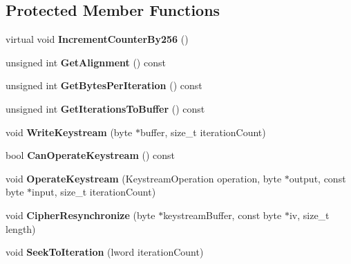 \subsection*{Protected Member Functions}
\begin{DoxyCompactItemize}
\item 
\hypertarget{class_c_t_r___mode_policy_a2827e15ef893609012cc1c0d672840b2}{
virtual void {\bfseries IncrementCounterBy256} ()}
\label{class_c_t_r___mode_policy_a2827e15ef893609012cc1c0d672840b2}

\item 
\hypertarget{class_c_t_r___mode_policy_a3e6d8211d0320374054c8fa580923d01}{
unsigned int {\bfseries GetAlignment} () const }
\label{class_c_t_r___mode_policy_a3e6d8211d0320374054c8fa580923d01}

\item 
\hypertarget{class_c_t_r___mode_policy_ac758ff43cc3c0cb3b98ef37cf6911c7f}{
unsigned int {\bfseries GetBytesPerIteration} () const }
\label{class_c_t_r___mode_policy_ac758ff43cc3c0cb3b98ef37cf6911c7f}

\item 
\hypertarget{class_c_t_r___mode_policy_a1c834bdba6ac84049d504329a2cff7b5}{
unsigned int {\bfseries GetIterationsToBuffer} () const }
\label{class_c_t_r___mode_policy_a1c834bdba6ac84049d504329a2cff7b5}

\item 
\hypertarget{class_c_t_r___mode_policy_a9626be1038a8e61d04292fa26169a4c5}{
void {\bfseries WriteKeystream} (byte $\ast$buffer, size\_\-t iterationCount)}
\label{class_c_t_r___mode_policy_a9626be1038a8e61d04292fa26169a4c5}

\item 
\hypertarget{class_c_t_r___mode_policy_a112371ceda7dd9ac20bc963a7d314185}{
bool {\bfseries CanOperateKeystream} () const }
\label{class_c_t_r___mode_policy_a112371ceda7dd9ac20bc963a7d314185}

\item 
\hypertarget{class_c_t_r___mode_policy_a7d00b3ca598777c5f9a42326b92ae47a}{
void {\bfseries OperateKeystream} (KeystreamOperation operation, byte $\ast$output, const byte $\ast$input, size\_\-t iterationCount)}
\label{class_c_t_r___mode_policy_a7d00b3ca598777c5f9a42326b92ae47a}

\item 
\hypertarget{class_c_t_r___mode_policy_a1329d48edfe1aa39cf9945a785b85516}{
void {\bfseries CipherResynchronize} (byte $\ast$keystreamBuffer, const byte $\ast$iv, size\_\-t length)}
\label{class_c_t_r___mode_policy_a1329d48edfe1aa39cf9945a785b85516}

\item 
\hypertarget{class_c_t_r___mode_policy_a9bf110f3ac5ed1b67fbfd2eb470ff32f}{
void {\bfseries SeekToIteration} (lword iterationCount)}
\label{class_c_t_r___mode_policy_a9bf110f3ac5ed1b67fbfd2eb470ff32f}

\end{DoxyCompactItemize}
